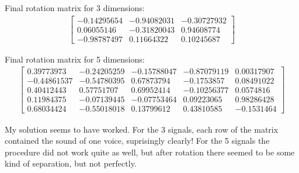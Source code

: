 \documentclass[12pt]{article}
\begin{document}
Final rotation matrix for 3 dimensions:
\begin{align*}
\begin{bmatrix}
  -0.14295654 & -0.94082031 & -0.30727932 \\
  0.06055146 & -0.31820043 & 0.94608774 \\
  -0.98787497 & 0.11664322 & 0.10245687
\end{bmatrix}
\end{align*}

Final rotation matrix for 5 dimensions:
\begin{align*}
\begin{bmatrix}
  0.39773973&-0.24205259& -0.15788047& -0.87079119 & 0.00317907\\
 -0.44861537& -0.54780395 & 0.67873794 &-0.1753857 & 0.08491022\\
  0.40412443&  0.57751707& 0.69952414 &-0.10256377 & 0.0574816 \\
  0.11984375& -0.07139445&-0.07753464 & 0.09223065 & 0.98286428\\
  0.68034424& -0.55018018 & 0.13799612 & 0.43810585& -0.1531464 
\end{bmatrix}
\end{align*}

My solution seems to have worked. For the 3 signals, each row of the matrix contained the sound of one voice, suprisingly clearly! For the 5 signals the procedure did not work quite as well, but after rotation there seemed to be some kind of separation, but not perfectly.
\end{document}
